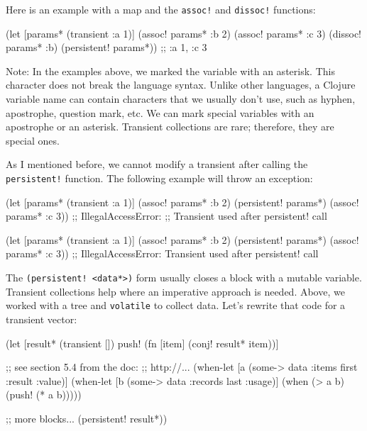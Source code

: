 \noindent
Here is an example with a map and the \verb|assoc!| and \verb|dissoc!| functions:

\begin{clojure}
(let [params* (transient {:a 1})]
  (assoc! params* :b 2)
  (assoc! params* :c 3)
  (dissoc! params* :b)
  (persistent! params*))
;; {:a 1, :c 3}
\end{clojure}

Note: In the examples above, we marked the variable with an asterisk.
This character does not break the language syntax.
Unlike other languages, a Clojure variable name can contain characters that we usually don't use, such as hyphen, apostrophe, question mark, etc.
We can mark special variables with an apostrophe or an asterisk.
Transient collections are rare; therefore, they are special ones.

As I mentioned before, we cannot modify a transient after calling the \verb|persistent!| function.
The following example will throw an exception:

\ifx\DEVICETYPE\MOBILE

\begin{clojure}
(let [params* (transient {:a 1})]
  (assoc! params* :b 2)
  (persistent! params*)
  (assoc! params* :c 3))
;; IllegalAccessError:
;; Transient used after persistent! call
\end{clojure}

\else

\begin{clojure}
(let [params* (transient {:a 1})]
  (assoc! params* :b 2)
  (persistent! params*)
  (assoc! params* :c 3))
;; IllegalAccessError: Transient used after persistent! call
\end{clojure}

\fi

The \verb|(persistent! <data*>)| form usually closes a block with a mutable variable.
Transient collections help where an imperative approach is needed. Above, we worked with a tree and \verb|volatile| to collect data.
Let's rewrite that code for a transient vector:

\ifx\DEVICETYPE\MOBILE

\begin{clojure}
(let [result* (transient [])
      push! (fn [item]
              (conj! result* item))]

  ;; see section 5.4 from the doc:
  ;; http://...
  (when-let [a (some-> data
                       :items
                       first
                       :result
                       :value)]
    (when-let [b (some-> data
                       :records
                       last
                       :usage)]
      (when (> a b)
        (push! (* a b)))))

  ;; more blocks...
  (persistent! result*))
\end{clojure}

